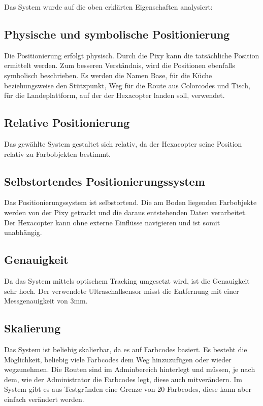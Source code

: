   Das System wurde auf die oben erklärten Eigenschaften analysiert:

  \subsection*{Physische und symbolische Positionierung}
  Die Positionierung erfolgt physisch. Durch die Pixy kann die tatsächliche Position ermittelt werden.
  Zum besseren Verständnis, wird die Positionen ebenfalls symbolisch beschrieben. Es werden die Namen Base, für die Küche beziehungsweise den Stützpunkt, Weg für die Route aus Colorcodes und Tisch, für die Landeplattform, auf der der Hexacopter landen soll, verwendet.

  \subsection*{Relative Positionierung}
  Das gewählte System gestaltet sich relativ, da der Hexacopter seine Position relativ zu Farbobjekten bestimmt.

  \subsection*{Selbstortendes Positionierungssystem}
  Das Positionierungssystem ist selbstortend. Die am Boden liegenden Farbobjekte werden von der Pixy getrackt und die daraus entstehenden Daten verarbeitet. Der Hexacopter kann ohne externe Einflüsse navigieren und ist somit unabhängig.

  \subsection*{Genauigkeit}
  Da das System mittels optischem Tracking umgesetzt wird, ist die Genauigkeit sehr hoch.
  Der verwendete Ultraschallsensor misst die Entfernung mit einer Messgenauigkeit von 3mm.

  \subsection*{Skalierung}
  Das System ist beliebig skalierbar, da es auf Farbcodes basiert. Es besteht die Möglichkeit, beliebig viele Farbcodes dem Weg hinzuzufügen oder wieder wegzunehmen. Die Routen sind im Adminbereich hinterlegt und müssen, je nach dem, wie der Administrator die Farbcodes legt, diese auch mitverändern. Im System gibt es aus Testgründen eine Grenze von 20 Farbcodes, diese kann aber einfach verändert werden.

